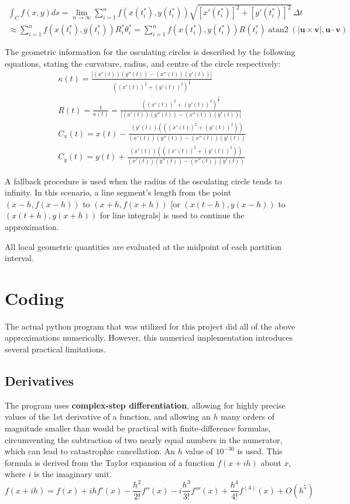 \documentclass{article}
\begin{document}
\begin{gather*}
\int_C f(x,y)ds = \lim_{n \to \infty} \sum_{i=1}^{n}f(x(t_i^*),y(t_i^*))\sqrt{[x'(t_i^*)]^2+[y'(t_i^*)]^2}\,\Delta t \\
\approx \sum_{i=1}^{n}f(x(t_i^*),y(t_i^*))R_i^*\theta_i^* = \sum_{i=1}^{n}f(x(t_i^*),y(t_i^*))R(t_i^*)\operatorname{atan2}(|\mathbf{u} \times \mathbf{v}|,\mathbf{u} \cdot \mathbf{v})
\end{gather*}

The geometric information for the osculating circles is described by the following equations, stating the curvature, radius, and centre of the circle respectively:
\begin{gather*}
\kappa(t) = \frac{|(x'(t))(y''(t))-(x''(t))(y'(t))|}{((x'(t))^2+(y'(t))^2)^\frac{3}{2}} \\
R(t) = \frac{1}{\kappa(t)} = \frac{((x'(t))^2+(y'(t))^2)^\frac{3}{2}}{|(x'(t))(y''(t))-(x''(t))(y'(t))|} \\
C_x(t) = x(t) - \frac{(y'(t))(((x'(t))^2+(y'(t))^2))}{(x'(t))(y''(t))-(x''(t))(y'(t))} \\
C_y(t) = y(t) + \frac{(x'(t))(((x'(t))^2+(y'(t))^2))}{(x'(t))(y''(t))-(x''(t))(y'(t))}
\end{gather*}

A fallback procedure is used when the radius of the osculating circle tends to infinity. In this scenario, a line segment's length from the point $(x-h,f(x-h))$ to $(x+h, f(x+h))$ [or $(x(t-h),y(x-h))$ to $(x(t+h),y(x+h))$ for line integrals] is used to continue the approximation.

All local geometric quantities are evaluated at the midpoint of each partition interval.

\newpage

\section{Coding}

The actual python program that was utilized for this project did all of the above approximations numerically. However, this numerical implementation introduces several practical limitations.

\subsection{Derivatives}

The program uses \textbf{complex-step differentiation}, allowing for highly precise values of the 1st derivative of a function, and allowing an $h$ many orders of magnitude smaller than would be practical with finite-difference formulas, circumventing the subtraction of two nearly equal numbers in the numerator, which can lead to catastrophic cancellation. An $h$ value of $10^{-30}$ is used.
This formula is derived from the Taylor expansion of a function $f(x+ih)$ about $x$, where $i$ is the imaginary unit. 
\[
f(x+ih)=f(x)+ihf'(x)-\frac{h^2}{2!}f''(x)-i\frac{h^3}{3!}f'''(x) + \frac{h^4}{4!}f^{(4)}(x) + O(h^5) 
\]
\end{document}
